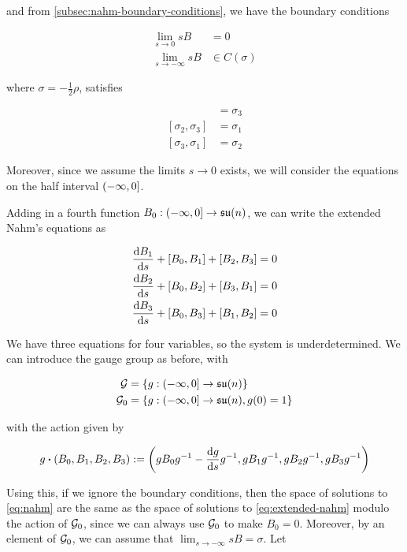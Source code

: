 \documentclass{report}
\newcommand{\su}{\mathfrak{su}}
\renewcommand{\sl}{\mathfrak{sl}}
\begin{document}
and from \cref{subsec:nahm-boundary-conditions}, we have the boundary conditions

\begin{align*}
    \lim_{s \to 0}sB &= 0 \\
    \lim_{s \to -\infty}sB &\in C(\sigma)
\end{align*}

where \(\sigma = -\frac12\rho\), satisfies

\begin{align*}
    [\sigma_1, \sigma_2] &= \sigma_3 \\
    [\sigma_2, \sigma_3] &= \sigma_1 \\
    [\sigma_3, \sigma_1] &= \sigma_2
\end{align*}

Moreover, since we assume the limits \(s \to 0\) exists, we will consider the equations on the half interval \((-\infty, 0]\).

Adding in a fourth function \(B_0 : \Ioc{-\infty, 0} \to \su(n)\), we can write the extended Nahm's equations as

\begin{equation}
    \label{eq:extended-nahm}
    \begin{split}
        \dv{B_1}{s} + [B_0, B_1] + [B_2, B_3] &= 0 \\
        \dv{B_2}{s} + [B_0, B_2] + [B_3, B_1] &= 0 \\
        \dv{B_3}{s} + [B_0, B_3] + [B_1, B_2] &= 0
    \end{split}
\end{equation}

We have three equations for four variables, so the system is underdetermined. We can introduce the gauge group as before, with

\begin{align*}
    \mcG &= \left\{g : \Ioc{-\infty, 0} \to \su(n)\right\} \\
    \mcG_0 &= \left\{g : \Ioc{-\infty, 0} \to \su(n), g(0) = 1\right\}
\end{align*}

with the action given by

\[g \vdot (B_0, B_1, B_2, B_3) := \left(gB_0g^{-1} - \dv{g}{s}g^{-1}, gB_1g^{-1}, gB_2g^{-1}, gB_3g^{-1}\right)\]

Using this, if we ignore the boundary conditions, then the space of solutions to \cref{eq:nahm} are the same as the space of solutions to \cref{eq:extended-nahm} modulo the action of \(\mathcal{G}_0\), since we can always use \(\mathcal{G}_0\) to make \(B_0 = 0\). Moreover, by an element of \(\mathcal{G}_0\), we can assume that \(\lim_{s \to -\infty}sB = \sigma\). Let
\end{document}
